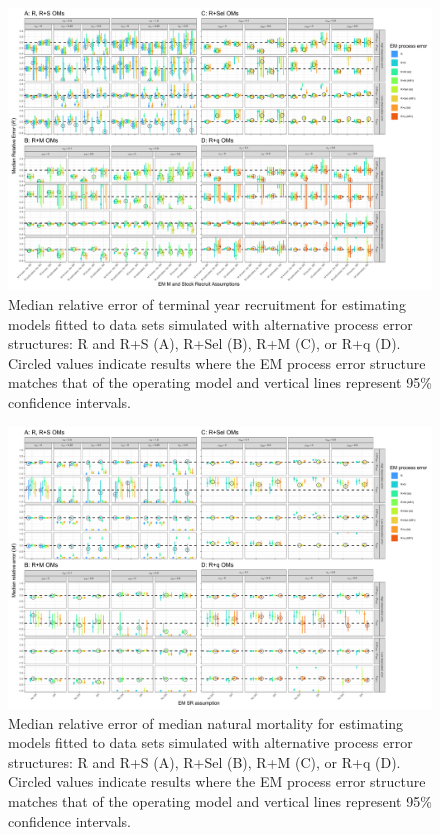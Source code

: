 \documentclass[
  12pt,
]{article}
\begin{document}
\begin{landscape}
\begin{figure}
\begin{center}
\includegraphics[width = 1.4\textwidth]{term_R_bias_plots}
\end{center}
\caption{Median relative error of terminal year recruitment for estimating models fitted to data sets simulated with alternative process error structures: R and R+S (A), R+Sel (B), R+M (C), or R+q (D). Circled values indicate results where the EM process error structure matches that of the operating model and vertical lines represent 95\% confidence intervals.}\label{R_rel_error}
\end{figure}
\end{landscape}

\begin{landscape}
\begin{figure}
\begin{center}
\includegraphics[width = 1.4\textwidth]{M_bias_plots}
\end{center}
\caption{Median relative error of median natural mortality for estimating models fitted to data sets simulated with alternative process error structures: R and R+S (A), R+Sel (B), R+M (C), or R+q (D). Circled values indicate results where the EM process error structure matches that of the operating model and vertical lines represent 95\% confidence intervals.}\label{M_rel_error}
\end{figure}
\end{landscape}
\end{document}
